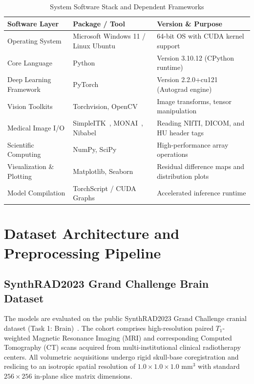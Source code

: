 \begin{table}[htbp]
\centering
\caption{System Software Stack and Dependent Frameworks}
\label{tab:software_req}
\small
\renewcommand{\arraystretch}{1.3}
\begin{tabularx}{\textwidth}{@{} l p{4.5cm} X @{}}
\toprule
\textbf{Software Layer} & \textbf{Package / Tool} & \textbf{Version \& Purpose} \\
\midrule
Operating System & Microsoft Windows 11 / Linux Ubuntu & 64-bit OS with CUDA kernel support \\
Core Language & Python & Version 3.10.12 (CPython runtime) \\
Deep Learning Framework & PyTorch~\cite{paszke2019pytorch} & Version 2.2.0+cu121 (Autograd engine) \\
Vision Toolkits & Torchvision, OpenCV & Image transforms, tensor manipulation \\
Medical Image I/O & SimpleITK~\cite{lowekamp2013simpleitk}, MONAI~\cite{monai2024framework}, Nibabel & Reading NIfTI, DICOM, and HU header tags \\
Scientific Computing & NumPy, SciPy & High-performance array operations \\
Visualization \& Plotting & Matplotlib, Seaborn & Residual difference maps and distribution plots \\
Model Compilation & TorchScript / CUDA Graphs & Accelerated inference runtime \\
\bottomrule
\end{tabularx}
\end{table}

\section{Dataset Architecture and Preprocessing Pipeline}

\subsection{SynthRAD2023 Grand Challenge Brain Dataset}
The models are evaluated on the public SynthRAD2023 Grand Challenge cranial dataset (Task 1: Brain)~\cite{thummerer2023synthrad2023,synthrad2023dataset}. The cohort comprises high-resolution paired $T_1$-weighted Magnetic Resonance Imaging (MRI) and corresponding Computed Tomography (CT) scans acquired from multi-institutional clinical radiotherapy centers. All volumetric acquisitions undergo rigid skull-base coregistration and reslicing to an isotropic spatial resolution of $1.0 \times 1.0 \times 1.0\text{ mm}^3$ with standard $256 \times 256$ in-plane slice matrix dimensions.

